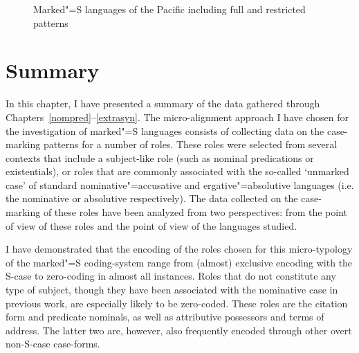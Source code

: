 \begin{figure}[h,t,b] \centering {} \caption{Marked"=S languages of the Pacific including full and restricted patterns}\label{MapPacAll}
\end{figure}


\section{Summary}\label{sumtyp}

In this chapter, I have presented a summary of the data gathered through Chapters~\ref{nompred}--\ref{extrasyn}. 
The micro-alignment approach I have chosen for the investigation of marked"=S languages consists of collecting data on the case-marking patterns for a number of roles. 
These roles were selected from several contexts that include a subject-like role (such as nominal predications or existentials), or roles that are commonly associated with the so-called `unmarked case' of standard nominative"=accusative and ergative"=absolutive languages (i.e. the nominative or absolutive respectively).
The data collected on the case-marking of these roles have been analyzed from two perspectives: from the point of view of these roles and the point of view of the languages studied.

I have demonstrated that the encoding of the roles chosen for this micro-ty\-po\-lo\-gy of the marked"=S coding-system range from (almost) exclusive encoding with the S-case to zero-coding in almost all instances. 
Roles that do not constitute any type of subject, though they have been associated with the nominative case in previous work, are especially likely to be zero-coded. 
These roles are the citation form and predicate nominals, as well as attributive possessors and terms of address. 
The latter two are, however, also frequently encoded through other overt non-S-case case-forms.

